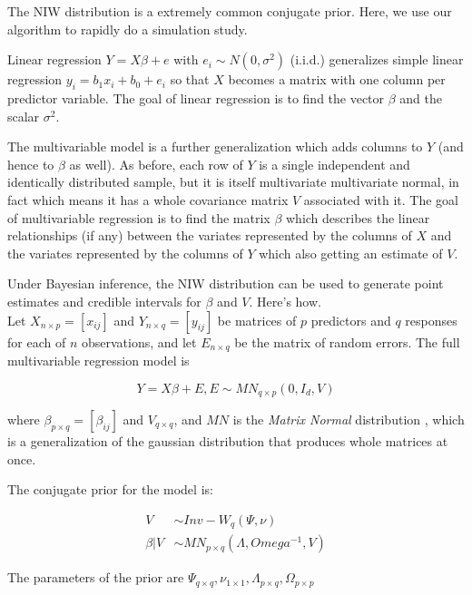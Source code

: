 \documentclass[english]{report}
\begin{document}

The NIW distribution is a extremely common conjugate prior. Here, we use our algorithm to rapidly do a simulation study.


Linear regression $Y = X\beta + e$ with $e_i \sim N(0, \sigma^2)$ (i.i.d.) generalizes simple linear regression $y_i = b_1 x_i + b_0 + e_i$ so that $X$ becomes a matrix with one column per predictor variable. The goal of linear regression is to find the vector $\beta$ and the scalar $\sigma^2$.

The multivariable model is a further generalization which adds columns to $Y$ (and hence to $\beta$ as well). As before, each row of $Y$ is a single independent and identically distributed sample, but it is itself multivariate \textendash multivariate normal, in fact \textendash which means it has a whole covariance matrix $V$ associated with it. The goal of multivariable regression is to find the matrix $\beta$ which describes the linear relationships (if any) between the variates represented by the columns of $X$ and the variates represented by the columns of $Y$ which also getting an estimate of $V$.

Under Bayesian inference, the NIW distribution can be used to generate point estimates and credible intervals for $\beta$ and $V$. Here's how.\\

Let $X_{n\times p} = [x_{ij}]$ and $Y_{n\times q} = [y_{ij}]$ be matrices of $p$ predictors and $q$ responses for each of $n$ observations, and let $E_{n\times q}$ be the matrix of random errors. The full multivariable regression model is

\[Y = X\beta + E, E \sim MN_{q \times p}(0, I_d, V)\]

where $\beta_{p\times q} = [\beta_{ij}] $ and $V_{q\times q}$, and $MN$ is the \emph{Matrix Normal} distribution \cite{MatrixNormal}, which is a generalization of the gaussian distribution that produces whole matrices at once.

The conjugate prior for the model is:

\begin{align*}
	V &\sim  Inv-W_q(\Psi,\nu)\\
	\beta|V &\sim MN_{p \times q}(\Lambda, Omega^{-1}, V)
\end{align*}

The parameters of the prior are $\Psi_{q\times q}, \nu_{1\times 1}, \Lambda_{p\times q}, \Omega_{p\times p}$\\
\end{document}
